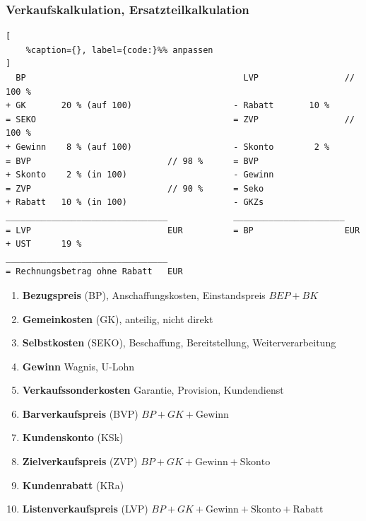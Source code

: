 \subsubsection{Verkaufskalkulation,
Ersatzteilkalkulation}\label{verkaufskalkulation-ersatzteilkalkulation}

\lstset{language=Python}%
\begin{lstlisting}[
	%caption={}, label={code:}%% anpassen
]
  BP                                           LVP                 // 100 %
+ GK       20 % (auf 100)                    - Rabatt       10 %                 
= SEKO                                       = ZVP                 // 100 %
+ Gewinn    8 % (auf 100)                    - Skonto        2 %
= BVP                           // 98 %      = BVP        
+ Skonto    2 % (in 100)                     - Gewinn
= ZVP                           // 90 %      = Seko                 
+ Rabatt   10 % (in 100)                     - GKZs
________________________________             ______________________          
= LVP                           EUR          = BP                  EUR
+ UST      19 %                                                 
________________________________                        
= Rechnungsbetrag ohne Rabatt   EUR                                 
\end{lstlisting}

\begin{enumerate}
\item
  \textbf{Bezugspreis} (BP), Anschaffungskosten, Einstandspreis
  $\boxed{BEP + BK}$
\item
  \textbf{Gemeinkosten} (GK), anteilig, nicht direkt
\item
  \textbf{Selbstkosten} (SEKO), Beschaffung, Bereitstellung,
  Weiterverarbeitung
\item
  \textbf{Gewinn} Wagnis, U-Lohn
\item
  \textbf{Verkaufssonderkosten} Garantie, Provision, Kundendienst
\item
  \textbf{Barverkaufspreis} (BVP) $\boxed{BP + GK + \text{Gewinn}}$
\item
  \textbf{Kundenskonto} (KSk)
\item
  \textbf{Zielverkaufspreis} (ZVP)
  $\boxed{BP + GK + \text{Gewinn} + \text{Skonto}}$
\item
  \textbf{Kundenrabatt} (KRa)
\item
  \textbf{Listenverkaufspreis} (LVP)
  $\boxed{BP + GK + \text{Gewinn} + \text{Skonto} + \text{Rabatt}}$
\end{enumerate}

